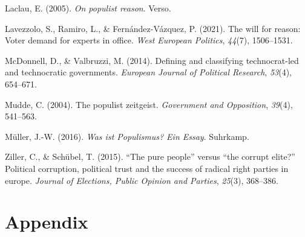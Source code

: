 \documentclass[
  12pt,
  english,
]{article}
\newlength{\cslhangindent}
\newlength{\cslentryspacingunit} %
\newenvironment{CSLReferences}[2] %
 {%
  \setlength{\parindent}{0pt}
  \ifodd #1
  \let\oldpar\par
  \def\par{\hangindent=\cslhangindent\oldpar}
  \fi
  \setlength{\parskip}{#2\cslentryspacingunit}
 }%
 {}
\begin{document}
\begin{CSLReferences}{1}{0}
\leavevmode{}%
Laclau, E. (2005). \emph{On populist reason}. Verso.

\leavevmode{}%
Lavezzolo, S., Ramiro, L., \& Fernández-Vázquez, P. (2021). The will for
reason: Voter demand for experts in office. \emph{West European
Politics}, \emph{44}(7), 1506--1531.

\leavevmode{}%
McDonnell, D., \& Valbruzzi, M. (2014). Defining and classifying
technocrat-led and technocratic governments. \emph{European Journal of
Political Research}, \emph{53}(4), 654--671.

\leavevmode{}%
Mudde, C. (2004). The populist zeitgeist. \emph{Government and
Opposition}, \emph{39}(4), 541--563.

\leavevmode{}%
Müller, J.-W. (2016). \emph{Was ist {Populismus}? Ein {Essay}}.
Suhrkamp.

\leavevmode{}%
Ziller, C., \& Schübel, T. (2015). {``The pure people''} versus {``the
corrupt elite?''} Political corruption, political trust and the success
of radical right parties in europe. \emph{Journal of Elections, Public
Opinion and Parties}, \emph{25}(3), 368--386.

\end{CSLReferences}

\newpage{}

\hypertarget{appendix}{%
\section{Appendix}\label{appendix}}
\end{document}
